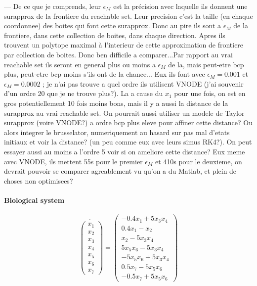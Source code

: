 \documentclass{sig-alternate-05-2015} %
\newcommand\ForAuthors[1]%
 {\par\smallskip                     %
  \begin{center}%
   \fbox%
   {\parbox{0.9\linewidth}%
    {\raggedright\sc--- #1}%
   }%
  \end{center}%
  \par\smallskip                     %
 }
\begin{document}
\ForAuthors{De ce que je comprends, leur $\epsilon_M$ est la pr\'ecision
avec laquelle ils donnent une surapprox de la frontiere du reachable set.
Leur precision c'est la taille (en chaque coordonnee) des boites qui 
font cette surapprox. Donc au pire ils sont a $\epsilon_M$ de la frontiere,
dans cette collection de boites, dans chaque direction. Apres ils trouvent
un polytope maximal \`a l'interieur de cette approximation de frontiere
par collection de boites. Donc ben difficile a comparer...Par rapport
au vrai reachable set ils seront en general plus ou moins a $\epsilon_M$
de la, mais peut-etre bcp plus, peut-etre bcp moins s'ils ont de la chance...
Eux ils font avec $\epsilon_M=0.001$ et $\epsilon_M=0.0002$ ; je n'ai 
pas trouve a quel ordre ils utilisent VNODE (j'ai souvenir d'un ordre
20 que je ne trouve plus?). La a cause du $x_1$ pour une fois, on est
en gros potentiellement 10 fois moins bons, mais il y a aussi la distance
de la surapprox au vrai reachable set. On pourrait aussi utiliser un 
modele de Taylor surapprox (voire VNODE?) a ordre bcp plus eleve pour
affiner cette distance? Ou alors integrer le brusselator, numeriquement
au hasard sur pas mal d'etats initiaux et voir la distance? (un peu comme
eux avec leurs simus RK4?). On peut essayer aussi au moins a l'ordre 5
voir si on ameliore cette distance? Eux meme avec VNODE, ils mettent
55s pour le premier $\epsilon_M$ et 410s pour le deuxieme, on devrait
pouvoir se comparer agreablement vu qu'on a du Matlab, et plein de choses
non optimisees?}


\paragraph{Biological system}


\begin{equation}
\dot{\left(\begin{array}{c}
x_1 \\
x_2 \\
x_3 \\
x_4 \\
x_5 \\
x_6 \\
x_7
\end{array}\right)} = \left(\begin{array}{c}
-0.4x_1+5x_3x_4 \\
0.4x_1-x_2 \\
x_2-5x_3x_4 \\
5x_5x_6-5x_3x_4 \\
-5x_5x_6+5x_3x_4 \\
0.5x_7-5x_5x_6 \\
-0.5x_7+5x_5x_6
\end{array}\right)
\end{equation}
\end{document}
